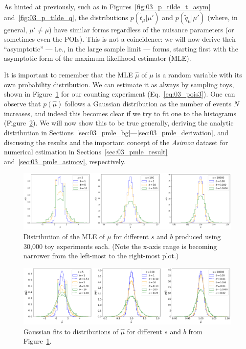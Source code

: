 As hinted at previously, such as in Figures~\ref{fig:03_p_tilde_t_asym} and~\ref{fig:03_p_tilde_q}, the distributions $p(\tilde{t}_\mu|\mu')$ and $p(\tilde{q}_\mu|\mu')$ (where, in general, $\mu' \neq \mu$) have similar forms regardless of the nuisance parameters (or sometimes even the POIs).
This is not a coincidence: we will now derive their ``asymptotic'' --- i.e., in the large sample limit --- forms, starting first with the asymptotic form of the maximum likelihood estimator (MLE).

It is important to remember that the MLE $\hat \mu$ of $\mu$ is a random variable with its own probability distribution.
We can estimate it as always by sampling toys, shown in Figure~\ref{fig:03_p_mle} for our counting experiment (Eq.~\ref{eq:03_pois3}).
One can observe that $p(\hat \mu)$ follows a Gaussian distribution as the number of events $N$ increases, and indeed this becomes clear if we try to fit one to the histograms (Figure~\ref{fig:03_p_mle_fit}).
We will now show this to be true generally, deriving the analytic distribution in Sections~\ref{sec:03_pmle_bg}---\ref{sec:03_pmle_derivation}, and discussing the results and the important concept of the \textit{Asimov} dataset for numerical estimation in Sections~\ref{sec:03_pmle_result} and~\ref{sec:03_pmle_asimov}, respectively.

\begin{figure}[htb]
\centering
\includegraphics[width=\textwidth]{figures/03-Stats/05-asymptotic-mle/1.png}
\caption{Distribution of the MLE of $\mu$ for different $s$ and $b$ produced using 30,000 toy experiments each. (Note the x-axis range is becoming narrower from the left-most to the right-most plot.)}
\label{fig:03_p_mle}
\end{figure}

\begin{figure}[htb]
\centering
\includegraphics[width=\textwidth]{figures/03-Stats/05-asymptotic-mle/2.png}
\caption{Gaussian fits to distributions of $\hat\mu$ for different $s$ and $b$ from Figure~\ref{fig:03_p_mle}.}
\label{fig:03_p_mle_fit}
\end{figure}


